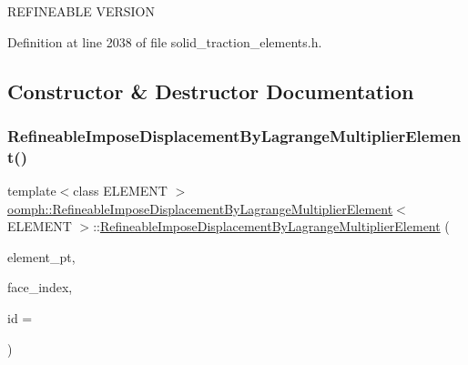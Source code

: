 R\+E\+F\+I\+N\+E\+A\+B\+LE V\+E\+R\+S\+I\+ON 

Definition at line 2038 of file solid\+\_\+traction\+\_\+elements.\+h.



\subsection{Constructor \& Destructor Documentation}
\mbox{\label{classoomph_1_1RefineableImposeDisplacementByLagrangeMultiplierElement_aeae23b8fca961db35d855e65f414b685}} 
\subsubsection{\texorpdfstring{Refineable\+Impose\+Displacement\+By\+Lagrange\+Multiplier\+Element()}{RefineableImposeDisplacementByLagrangeMultiplierElement()}}
{\footnotesize\ttfamily template$<$class E\+L\+E\+M\+E\+NT $>$ \\
\hyperlink{classoomph_1_1RefineableImposeDisplacementByLagrangeMultiplierElement}{oomph\+::\+Refineable\+Impose\+Displacement\+By\+Lagrange\+Multiplier\+Element}$<$ E\+L\+E\+M\+E\+NT $>$\+::\hyperlink{classoomph_1_1RefineableImposeDisplacementByLagrangeMultiplierElement}{Refineable\+Impose\+Displacement\+By\+Lagrange\+Multiplier\+Element} (\begin{DoxyParamCaption}\item[{\hyperlink{classoomph_1_1FiniteElement}{Finite\+Element} $\ast$const \&}]{element\+\_\+pt,  }\item[{const int \&}]{face\+\_\+index,  }\item[{const unsigned \&}]{id = {} }\end{DoxyParamCaption})\hspace{0.3cm}{\ttfamily [inline]}}



